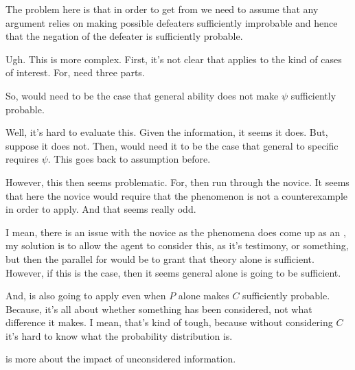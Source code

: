 \begin{note}
  \color{red}
  The problem here is that in order to get \nI{} from \wnf{} we need to assume that any argument relies on making possible defeaters sufficiently improbable and hence that the negation of the defeater is sufficiently probable.

  Ugh.
  This is more complex.
  First, it's not clear that \wnf{} applies to the kind of cases of interest.
  For, need three parts.

  So, would need to be the case that general ability does not make \(\psi\) sufficiently probable.

  Well, it's hard to evaluate this.
  Given the information, it seems it does.
  But, suppose it does not.
  Then, would need it to be the case that general to specific requires \(\psi\).
  This goes back to assumption before.

  However, this then seems problematic.
  For, then run through the novice.
  It seems that here the novice would require that the phenomenon is not a counterexample in order to apply.
  And that seems really odd.

  I mean, there is an issue with the novice as the phenomena does come up as an \requ{}, my solution is to allow the agent to consider this, as it's testimony, or something, but then the parallel for \wnf{} would be to grant that theory alone is sufficient.
  However, if this is the case, then it seems general alone is going to be sufficient.

  And, \nI{} is also going to apply even when \(P\) alone makes \(C\) sufficiently probable.
  Because, it's all about whether something has been considered, not what difference it makes.
  I mean, that's kind of tough, because without considering \(C\) it's hard to know what the probability distribution is.

  \nI{} is more about the impact of unconsidered information.
\end{note}

